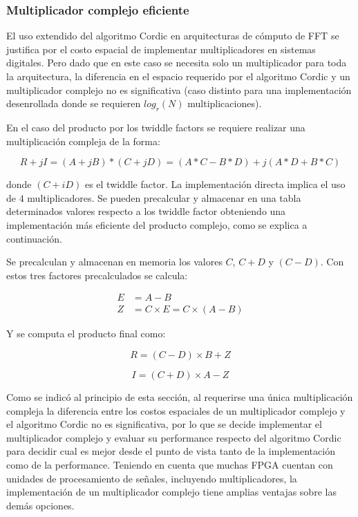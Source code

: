 \subsubsection{Multiplicador complejo eficiente}

El uso extendido del algoritmo Cordic en arquitecturas de cómputo de FFT se justifica por el costo
espacial de implementar multiplicadores en sistemas digitales.
Pero dado que en este caso se necesita solo un multiplicador para toda la arquitectura, la
diferencia en el espacio requerido por el algoritmo Cordic y un multiplicador complejo no es
significativa (caso distinto para una implementación desenrollada donde se requieren $log_r(N)$
multiplicaciones).

En el caso del producto por los twiddle factors se requiere realizar una multiplicación compleja de
la forma:

\begin{equation}
R+jI = (A+jB)*(C+jD) = (A*C-B*D) + j(A*D+B*C)
\label{eq:prodcomp4}
\end{equation}

donde $(C+iD)$ es el twiddle factor. La implementación directa implica el uso de $4$
multiplicadores.
Se pueden precalcular y almacenar en una tabla determinados valores respecto a los twiddle factor
obteniendo una implementación más eficiente del producto complejo, como se explica a continuación.

Se precalculan y almacenan en memoria los valores $C$, $C+D$ y $(C-D)$. Con estos tres factores
precalculados se calcula:

\begin{equation}
\begin{split}
E &= A-B \\
Z &= C \times E = C \times (A-B)
\end{split}
\label{eq:prodcompZ}
\end{equation}

Y se computa el producto final como:

\begin{equation}
R = (C-D) \times B + Z
\label{eq:prodcompR}
\end{equation}

\begin{equation}
I = (C+D) \times A - Z
\label{eq:prodcompI}
\end{equation}

Como se indicó al principio de esta sección, al requerirse una única multiplicación compleja la
diferencia entre los costos espaciales de un multiplicador complejo y el algoritmo Cordic no es
significativa, por lo que se decide implementar el multiplicador complejo y evaluar su performance
respecto del algoritmo Cordic para decidir cual es mejor desde el punto de vista tanto de la
implementación como de la performance. Teniendo en cuenta que muchas FPGA cuentan con
unidades de procesamiento de señales, incluyendo multiplicadores, la implementación
de un multiplicador complejo tiene amplias ventajas sobre las demás opciones.

